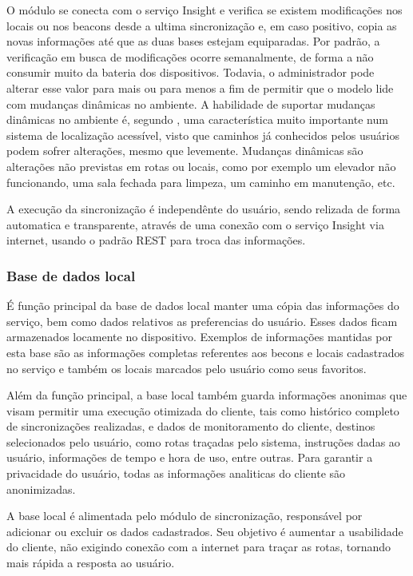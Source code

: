 \documentclass[english,brazilian]{UNISINOSmonografia}
\begin{document}
O módulo se conecta com o serviço Insight e verifica se existem modificações nos locais ou nos beacons desde a ultima sincronização e, em caso positivo, copia as novas informações até que as duas bases estejam equiparadas. Por padrão, a verificação em busca de modificações ocorre semanalmente, de forma a não consumir muito da bateria dos dispositivos. Todavia, o administrador pode alterar esse valor para mais ou para menos a fim de permitir que o modelo lide com mudanças dinâmicas no ambiente. A habilidade de suportar mudanças dinâmicas no ambiente é, segundo , uma característica muito importante num sistema de localização acessível, visto que caminhos já conhecidos pelos usuários podem sofrer alterações, mesmo que levemente. Mudanças dinâmicas são alterações não previstas em rotas ou locais, como por exemplo um elevador não funcionando, uma sala fechada para limpeza, um caminho em manutenção, etc.

A execução da sincronização é independênte do usuário, sendo relizada de forma automatica e transparente, através de uma conexão com o serviço Insight via internet, usando o padrão REST para troca das informações.

		\subsubsection{Base de dados local}
É função principal da base de dados local manter uma cópia das informações do serviço, bem como dados relativos as preferencias do usuário. Esses dados ficam armazenados locamente no dispositivo. Exemplos de informações mantidas por esta base são as informações completas referentes aos becons e locais cadastrados no serviço e também os locais marcados pelo usuário como seus favoritos.

Além da função principal, a base local também guarda informações anonimas que visam permitir uma execução otimizada do cliente, tais como histórico completo de sincronizações realizadas, e dados de monitoramento do cliente, destinos selecionados pelo usuário, como rotas traçadas pelo sistema, instruções dadas ao usuário, informações de tempo e hora de uso, entre outras. Para garantir a privacidade do usuário, todas as informações analiticas do cliente são anonimizadas.

A base local é alimentada pelo módulo de sincronização, responsável por adicionar ou excluir os dados cadastrados. Seu objetivo é aumentar a usabilidade do cliente, não exigindo conexão com a internet para traçar as rotas, tornando mais rápida a resposta ao usuário.
\end{document}
